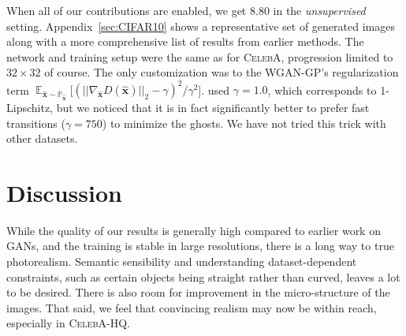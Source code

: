 When all of our contributions are enabled, we get $8.80$ in the \emph{unsupervised} setting. Appendix~\ref{sec:CIFAR10} shows a representative set of generated images along with a more comprehensive list of results from earlier methods. The network and training setup were the same as for \textsc{CelebA}, progression limited to $32\times32$ of course. The only customization was to the WGAN-GP's regularization term $\mathop{\mathbb{E}}_{\hat{\mathbf{x}}\sim\mathbb{P}_{\hat{\mathbf{x}}}} [(||\nabla_{\hat{\mathbf{x}}}D(\hat{\mathbf{x}})||_2 - \gamma)^2 / \gamma^2$]. \cite{Gulrajani2017} used $\gamma=1.0$, which corresponds to \mbox{1-Lipschitz}, but we noticed that it is in fact significantly better to prefer fast transitions ($\gamma=750$) to minimize the ghosts. We have not tried this trick with other datasets.

\section{Discussion}
\label{sec:discussion}

While the quality of our results is generally high compared to earlier work on GANs, and the training is stable in large resolutions, there is a long way to true photorealism. Semantic sensibility and understanding dataset-dependent constraints, such as certain objects being straight rather than curved, leaves a lot to be desired. There is also room for improvement in the micro-structure of the images. That said, we feel that convincing realism may now be within reach, especially in \textsc{CelebA-HQ}.


